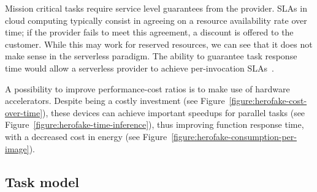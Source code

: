 
Mission critical tasks require service level guarantees from the provider. SLAs in cloud computing typically consist in agreeing on a resource availability rate over time; if the provider fails to meet this agreement, a discount is offered to the customer. While this may work for reserved resources, we can see that it does not make sense in the serverless paradigm. The ability to guarantee task response time would allow a serverless provider to achieve per-invocation SLAs~\cite{zhangMArkExploitingCloud}.


A possibility to improve performance-cost ratios is to make use of hardware accelerators. Despite being a costly investment (see Figure~\ref{figure:herofake-cost-over-time}), these devices can achieve important speedups for parallel tasks (see Figure~\ref{figure:herofake-time-inference}), thus improving function response time, with a decreased cost in energy (see Figure~\ref{figure:herofake-consumption-per-image}).

\subsection{Task model} \label{model:tasks}

